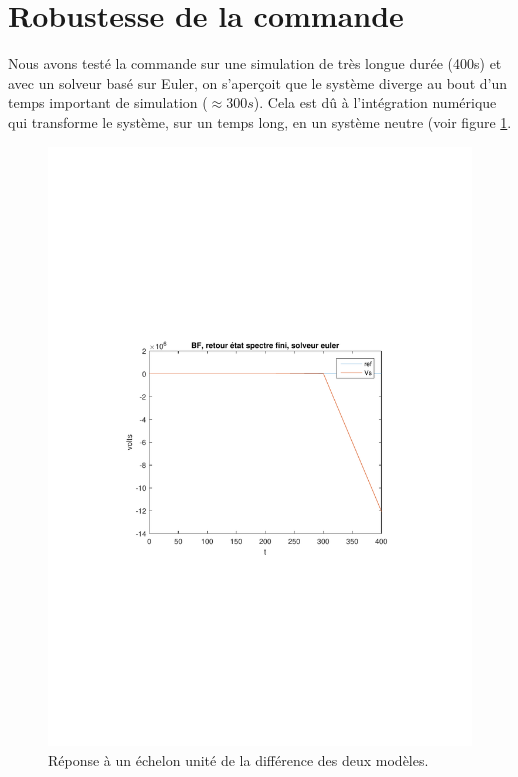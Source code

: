\section{Robustesse de la commande}
Nous avons testé la commande sur une simulation de très longue durée (400s) et avec un solveur basé sur Euler, on s'aperçoit que le système diverge au bout d'un temps important de simulation ($\approx 300 s$). Cela est dû à l'intégration numérique qui transforme le système, sur un temps long, en un système neutre (voir figure \ref{fig:Vs400}.
\begin{figure}[!ht]
\centering
\includegraphics[width=.7\textwidth]{./III/images/Vg_RESpecFini_400.pdf}
\caption{\label{fig:Vs400} Réponse à un échelon unité de la différence des deux modèles.}
\end{figure}
